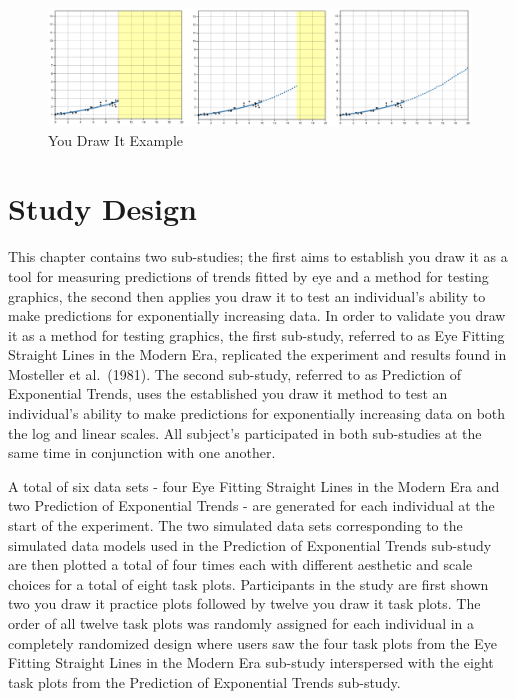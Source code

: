 \documentclass[print]{nuthesis}
\begin{document}
\begin{figure}[tbp]

{\centering \includegraphics[width=1\linewidth,]{images/ydiExample-0.10-10-linear} 

}

\caption{You Draw It Example}\label{fig:youdrawit-example}
\end{figure}

\hypertarget{study-design-1}{%
\section{Study Design}\label{study-design-1}}

This chapter contains two sub-studies; the first aims to establish you draw it as a tool for measuring predictions of trends fitted by eye and a method for testing graphics, the second then applies you draw it to test an individual's ability to make predictions for exponentially increasing data.
In order to validate you draw it as a method for testing graphics, the first sub-study, referred to as Eye Fitting Straight Lines in the Modern Era, replicated the experiment and results found in Mosteller et al.~(1981).
The second sub-study, referred to as Prediction of Exponential Trends, uses the established you draw it method to test an individual's ability to make predictions for exponentially increasing data on both the log and linear scales.
All subject's participated in both sub-studies at the same time in conjunction with one another.

A total of six data sets - four Eye Fitting Straight Lines in the Modern Era and two Prediction of Exponential Trends - are generated for each individual at the start of the experiment.
The two simulated data sets corresponding to the simulated data models used in the Prediction of Exponential Trends sub-study are then plotted a total of four times each with different aesthetic and scale choices for a total of eight task plots.
Participants in the study are first shown two you draw it practice plots followed by twelve you draw it task plots.
The order of all twelve task plots was randomly assigned for each individual in a completely randomized design where users saw the four task plots from the Eye Fitting Straight Lines in the Modern Era sub-study interspersed with the eight task plots from the Prediction of Exponential Trends sub-study.
\end{document}
